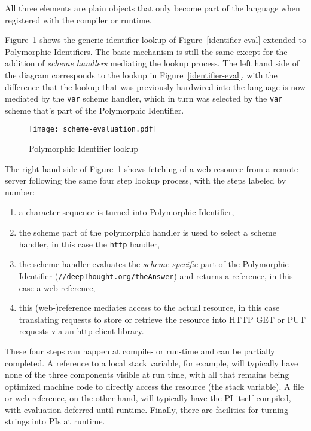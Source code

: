 \documentclass[preprint,authoryear]{llncs}
\begin{document}
All three elements are plain objects that only become part of the language when registered
with the compiler or runtime.

Figure~\ref{scheme-eval} shows the generic identifier lookup of Figure~\ref{identifier-eval}
extended to Polymorphic Identifiers.  The basic mechanism is still the same except for the
addition of \emph{scheme handlers} mediating the lookup process.  The left hand side of the
diagram corresponds to the lookup in Figure~\ref{identifier-eval}, with the difference that
the lookup that was previously hardwired into the language is now mediated by the {\tt var}
scheme handler, which in turn was selected by the {\tt var} scheme that's part of the 
Polymorphic Identifier.


\begin{figure}[htbp]
\begin{center}
\texttt{[image: scheme-evaluation.pdf]}
\caption{Polymorphic Identifier lookup}
\label{scheme-eval}
\end{center}
\end{figure}


The right hand side of Figure~\ref{scheme-eval} shows fetching of a web-resource from
a remote server following the same four step lookup process, with the steps labeled by
number:

\begin{enumerate}
\item a character sequence is turned into  Polymorphic Identifier,
\item the scheme part of the polymorphic handler is used to select a scheme handler, in this case the {\tt http} handler,
\item the scheme handler evaluates the \emph{scheme-specific} part of the Polymorphic Identifier ({\tt //deepThought.org/theAnswer})
	 and returns a reference, in this case a web-reference,
\item this (web-)reference mediates access to the actual resource, in this case translating requests to store or retrieve the 
	resource into HTTP GET or PUT requests via an http client library.
\end{enumerate}

These four steps can happen at compile- or run-time and can be partially completed.
A reference to a local stack variable, for example, will typically have none of the
three components visible at run time, with all that remains being optimized 
machine code to directly access the resource (the stack variable).
A file or web-reference, on the other hand, will typically have the PI itself
compiled, with evaluation deferred until runtime.  Finally, there are facilities
for turning strings into PIs at runtime.
\end{document}
